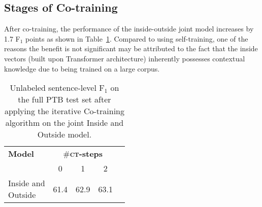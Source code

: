 \documentclass[11pt]{article}
\newcommand{\ptb}{\textsc{PTB}}
\begin{document}
\subsection{Stages of Co-training}
\label{appx:stages-co-training}
After co-training, the performance of the inside-outside joint model increases by 1.7 F$_1$ points as shown in Table~\ref{tab:co-training}. Compared to using self-training, one of the reasons the benefit is not significant may be attributed to the fact that the inside vectors (built upon Transformer architecture) inherently possesses contextual knowledge due to being trained on a large corpus.
\begin{table}[t]
    \centering
    \small
    \begin{tabular}{lcccc}
        \toprule
         \textbf{Model} & \multicolumn{3}{c}{ \#\textbf{{\textsc{ct}}-steps}} \\
         & 0 & 1 & 2 \\
        \midrule
         \makecell{Inside and\\Outside} & 61.4 & 62.9 & 63.1 \\
        \bottomrule
    \end{tabular}
    \caption{Unlabeled sentence-level F$_1$ on the full \ptb{} test set after applying the iterative Co-training algorithm on the joint Inside and Outside model.}
    \label{tab:co-training}
\end{table} 
\end{document}
